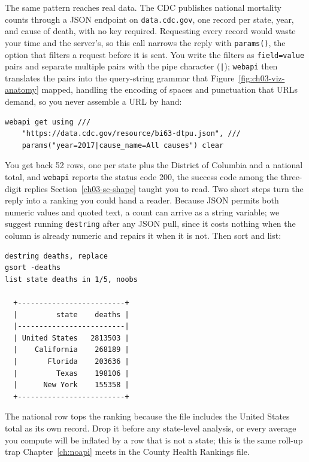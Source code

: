 \documentclass[
    a4paper,
    fontsize=10pt,
    twoside=true,
    numbers=noenddot,
]{kaobook}
\begin{document}
The same pattern reaches real data. The CDC publishes national mortality counts through a JSON endpoint on \texttt{data.cdc.gov}, one record per state, year, and cause of death, with no key required. Requesting every record would waste your time and the server's, so this call narrows the reply with \texttt{params()}, the option that filters a request before it is sent. You write the filters as \texttt{field=value} pairs and separate multiple pairs with the pipe character (\texttt{|}); \texttt{webapi} then translates the pairs into the query-string grammar that Figure~\ref{fig:ch03-viz-anatomy} mapped, handling the encoding of spaces and punctuation that URLs demand, so you never assemble a URL by hand:
\par
{\footnotesize
\begin{verbatim}
webapi get using ///
    "https://data.cdc.gov/resource/bi63-dtpu.json", ///
    params("year=2017|cause_name=All causes") clear
\end{verbatim}
}
You get back 52 rows, one per state plus the District of Columbia and a national total, and \texttt{webapi} reports the status code 200, the success code among the three-digit replies Section~\ref{ch03-sc-shape} taught you to read. Two short steps turn the reply into a ranking you could hand a reader. Because JSON permits both numeric values and quoted text, a count can arrive as a string variable; we suggest running \texttt{destring} after any JSON pull, since it costs nothing when the column is already numeric and repairs it when it is not. Then sort and list:
\par
{\footnotesize
\begin{verbatim}
destring deaths, replace
gsort -deaths
list state deaths in 1/5, noobs

  +-------------------------+
  |         state    deaths |
  |-------------------------|
  | United States   2813503 |
  |    California    268189 |
  |       Florida    203636 |
  |         Texas    198106 |
  |      New York    155358 |
  +-------------------------+
\end{verbatim}
}
The national row tops the ranking because the file includes the United States total as its own record. Drop it before any state-level analysis, or every average you compute will be inflated by a row that is not a state; this is the same roll-up trap Chapter~\ref{ch:noapi} meets in the County Health Rankings file.
\end{document}
